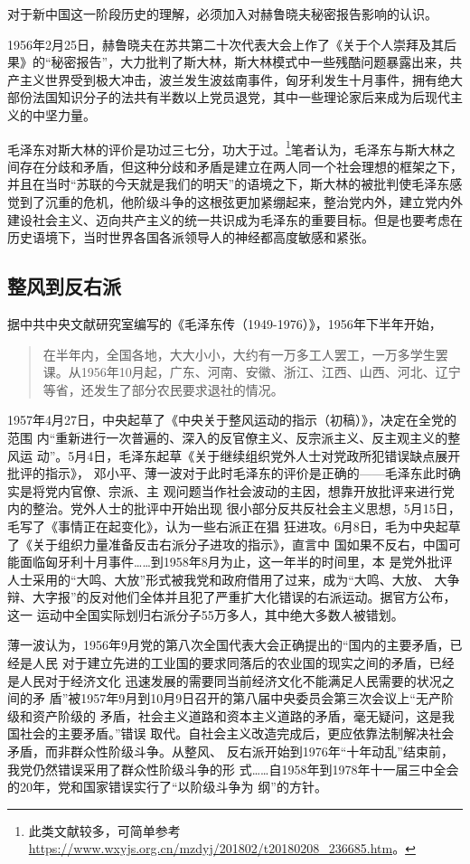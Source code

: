 对于新中国这一阶段历史的理解，必须加入对赫鲁晓夫秘密报告影响的认识。

1956年2月25日，赫鲁晓夫在苏共第二十次代表大会上作了《关于个人崇拜及其后果》的“秘密报告”，大力批判了斯大林，斯大林模式中一些残酷问题暴露出来，共产主义世界受到极大冲击，波兰发生波兹南事件，匈牙利发生十月事件，拥有绝大部份法国知识分子的法共有半数以上党员退党，其中一些理论家后来成为后现代主义的中坚力量。

毛泽东对斯大林的评价是功过三七分，功大于过。\footnote{此类文献较多，可简单参考\url{https://www.wxyjs.org.cn/mzdyj/201802/t20180208_236685.htm}。}笔者认为，毛泽东与斯大林之间存在分歧和矛盾，但这种分歧和矛盾是建立在两人同一个社会理想的框架之下，并且在当时“苏联的今天就是我们的明天”的语境之下，斯大林的被批判使毛泽东感觉到了沉重的危机，他阶级斗争的这根弦更加紧绷起来，整治党内外，建立党内外建设社会主义、迈向共产主义的统一共识成为毛泽东的重要目标。但是也要考虑在历史语境下，当时世界各国各派领导人的神经都高度敏感和紧张。

\subsection{整风到反右派}

据中共中央文献研究室编写的《毛泽东传（1949-1976）》，1956年下半年开始，
\begin{quotation}在半年内，全国各地，大大小小，大约有一万多工人罢工，一万多学生罢课。从1956年10月起，广东、河南、安徽、浙江、江西、山西、河北、辽宁等省，还发生了部分农民要求退社的情况。
\end{quotation}

1957年4月27日，中央起草了《中央关于整风运动的指示（初稿）》，决定在全党的范围
内“重新进行一次普遍的、深入的反官僚主义、反宗派主义、反主观主义的整风运
动”。5月4日，毛泽东起草《关于继续组织党外人士对党政所犯错误缺点展开批评的指示》，
邓小平、薄一波对于此时毛泽东的评价是正确的——毛泽东此时确实是将党内官僚、宗派、主
观问题当作社会波动的主因，想靠开放批评来进行党内的整治。党外人士的批评中开始出现
很小部分反共反社会主义思想，5月15日，毛写了《事情正在起变化》，认为一些右派正在猖
狂进攻。6月8日，毛为中央起草了《关于组织力量准备反击右派分子进攻的指示》，直言中
国如果不反右，中国可能面临匈牙利十月事件……到1958年8月为止，这一年半的时间里，本
是党外批评人士采用的“大鸣、大放”形式被我党和政府借用了过来，成为“大鸣、大放、
大争辩、大字报”的反对他们全体并且犯了严重扩大化错误的右派运动。据官方公布，这一
运动中全国实际划归右派分子55万多人，其中绝大多数人被错划。

薄一波认为，1956年9月党的第八次全国代表大会正确提出的“国内的主要矛盾，已经是人民
对于建立先进的工业国的要求同落后的农业国的现实之间的矛盾，已经是人民对于经济文化
迅速发展的需要同当前经济文化不能满足人民需要的状况之间的矛
盾”被1957年9月到10月9日召开的第八届中央委员会第三次会议上“无产阶级和资产阶级的
矛盾，社会主义道路和资本主义道路的矛盾，毫无疑问，这是我国社会的主要矛盾。”错误
取代。自社会主义改造完成后，更应依靠法制解决社会矛盾，而非群众性阶级斗争。从整风、
反右派开始到1976年“十年动乱”结束前，我党仍然错误采用了群众性阶级斗争的形
式……自1958年到1978年十一届三中全会的20年，党和国家错误实行了“以阶级斗争为
纲”的方针。

